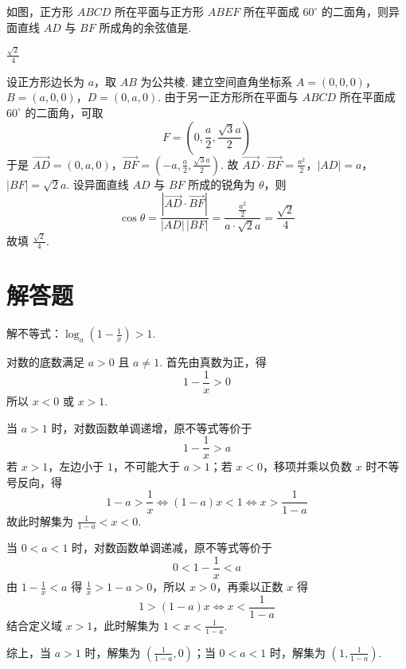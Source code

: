 \begin{problem}
如图，正方形 \(ABCD\) 所在平面与正方形 \(ABEF\) 所在平面成 \(60^{\circ}\) 的二面角，则异面直线 \(AD\) 与 \(BF\) 所成角的余弦值是\fillinblank{}.

\end{problem}

\begin{answer}
\(\frac{\sqrt{2}}{4}\)
\end{answer}

\begin{solution}
设正方形边长为 \(a\)，取 \(AB\) 为公共棱. 建立空间直角坐标系
\(A=(0,0,0)\)，\(B=(a,0,0)\)，\(D=(0,a,0)\).
由于另一正方形所在平面与 \(ABCD\) 所在平面成 \(60^{\circ}\) 的二面角，可取
\[
F=\left(0,\frac a2,\frac{\sqrt3a}{2}\right)
\]
于是
\(\overrightarrow{AD}=(0,a,0)\)，\(\overrightarrow{BF}=\left(-a,\frac a2,\frac{\sqrt3a}{2}\right)\).
故
\(\overrightarrow{AD}\cdot\overrightarrow{BF}=\frac{a^2}{2}\)，\(|AD|=a\)，\(|BF|=\sqrt2a\).
设异面直线 \(AD\) 与 \(BF\) 所成的锐角为 \(\theta\)，则
\[
\cos\theta=\frac{\left|\overrightarrow{AD}\cdot\overrightarrow{BF}\right|}
{|AD|\,|BF|}
=\frac{\frac{a^2}{2}}{a\cdot\sqrt2a}
=\frac{\sqrt2}{4}
\]
故填 \(\frac{\sqrt2}{4}\).
\end{solution}

\section{解答题}

\begin{problem}
解不等式：\(\log_a\left(1 - \frac{1}{x}\right) > 1\).
\end{problem}

\begin{solution}
对数的底数满足 \(a>0\) 且 \(a\neq1\). 首先由真数为正，得
\[
1-\frac1x>0
\]
所以 \(x<0\) 或 \(x>1\).

当 \(a>1\) 时，对数函数单调递增，原不等式等价于
\[
1-\frac1x>a
\]
若 \(x>1\)，左边小于 \(1\)，不可能大于 \(a>1\)；若 \(x<0\)，移项并乘以负数 \(x\) 时不等号反向，得
\[
1-a>\frac1x
\Longleftrightarrow
(1-a)x<1
\Longleftrightarrow
x>\frac1{1-a}
\]
故此时解集为 \(\frac1{1-a}<x<0\).

当 \(0<a<1\) 时，对数函数单调递减，原不等式等价于
\[
0<1-\frac1x<a
\]
由 \(1-\frac1x<a\) 得 \(\frac1x>1-a>0\)，所以 \(x>0\)，再乘以正数 \(x\) 得
\[
1>(1-a)x
\Longleftrightarrow
x<\frac1{1-a}
\]
结合定义域 \(x>1\)，此时解集为 \(1<x<\frac1{1-a}\).

综上，当 \(a>1\) 时，解集为 \(\left(\frac1{1-a},0\right)\)；当 \(0<a<1\) 时，解集为 \(\left(1,\frac1{1-a}\right)\).
\end{solution}

